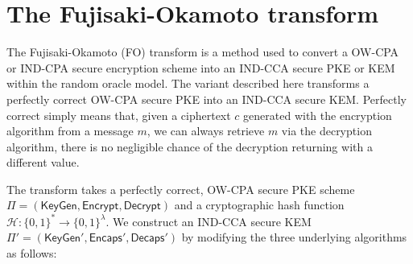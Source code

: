 \section{The Fujisaki-Okamoto transform}


The Fujisaki-Okamoto (FO) transform is a method used to convert a OW-CPA or IND-CPA secure encryption scheme into an IND-CCA secure PKE or KEM within the random oracle model. The variant described here transforms a perfectly correct OW-CPA secure PKE into an IND-CCA secure KEM. Perfectly correct simply means that, given a ciphertext $c$ generated with the encryption algorithm from a message $m$, we can always retrieve $m$ via the decryption algorithm, there is no negligible chance of the decryption returning with a different value.

The transform takes a perfectly correct, OW-CPA secure PKE scheme $\Pi = (\mathsf{KeyGen}, \mathsf{Encrypt}, \mathsf{Decrypt})$ and a cryptographic hash function $\mathcal{H}: \{0,1\}^* \to \{0,1\}^\lambda$. We construct an IND-CCA secure KEM $\Pi' = (\mathsf{KeyGen}', \mathsf{Encaps}', \mathsf{Decaps}')$ by modifying the three underlying algorithms as follows:

